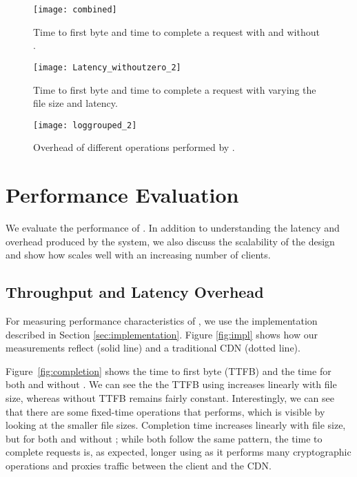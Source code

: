 \begin{figure*}[t!]
\vspace{-2mm}
  \begin{minipage}[t]{.31\linewidth}
    \centering
     \texttt{[image: combined]}
    \caption{Time to first byte and time to complete a request with and without \system{}.}
    \label{fig:completion}
  \end{minipage}
  \hfill
  \begin{minipage}[t]{.29\linewidth}
    \centering
    \texttt{[image: Latency\_withoutzero\_2]}
    \caption{Time to first byte and time to complete a request with varying the file size and latency.}%
    \label{fig:latency}
  \end{minipage}
  \hfill
  \begin{minipage}[t]{.35\linewidth}
    \centering
    \texttt{[image: loggrouped\_2]}
\caption{Overhead of different operations performed by \system{}.}
\label{fig:overhead2}
  \end{minipage}
\end{figure*}


\section{Performance Evaluation}
\label{sec:performance}
We evaluate the performance 
of \system{}.  In addition to understanding the latency and overhead produced by the 
system, we also discuss the scalability of the design and show how \system{} scales 
well with an increasing number of clients.

\subsection{Throughput and Latency Overhead}
For measuring performance characteristics of \system{}, we use the implementation 
described in Section \ref{sec:implementation}.  Figure \ref{fig:impl} shows 
how our measurements reflect \system{} (solid line) and a traditional CDN (dotted 
line).  

Figure~\ref{fig:completion} shows the time to first byte (TTFB) and the time for
both \system{} and 
without \system{}.  We can see the the TTFB using \system{} increases linearly with
file size, whereas without \system{} TTFB remains fairly constant.  Interestingly, 
we can see that there are some fixed-time operations that \system{} performs, which
is visible by looking at the smaller file sizes. Completion time increases linearly
with file size, but for both \system{} and without \system{}; while both follow the
same pattern, the time to complete requests is, as expected, longer using \system{} as it performs many cryptographic operations and proxies traffic between the client and the CDN.

